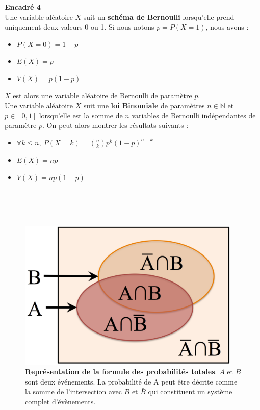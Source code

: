 \setlength{\columnsep}{1cm}
 \begin{minipage}{0.9\linewidth}
 \textbf{Encadré 4} \\
Une variable aléatoire $X$ suit un \textbf{schéma de Bernoulli} lorsqu'elle prend uniquement deux valeurs 0 ou 1. Si nous notons $p=P(X=1)$, nous avons :
\begin{itemize}
\item $P(X=0)=1-p$
\item $E(X)=p$
\item $V(X)=p(1-p)$
\end{itemize}
$X$ est alors une variable aléatoire de Bernoulli de paramètre $p$. \\
Une variable aléatoire $X$ suit une \textbf{loi Binomiale} de paramètres $n\in\mathbb{N}$ et $p\in[0,1]$ lorsqu'elle est la somme de $n$ variables de Bernoulli indépendantes de paramètre $p$. On peut alors montrer les résultats suivants :
\begin{itemize}
\item $\forall k \leq n,~ P(X=k)=\binom{n}{k}p^k(1-p)^{n-k}$
\item $E(X)=np$
\item $V(X)=np(1-p)$
\end{itemize}
 \end{minipage}
\\  \\  \\


\begin{figure}[h!]
\centering
\includegraphics[width=0.95\textwidth]{annexe1/fig/figAnnI3.pdf}
\caption[Représentation de la formule des probabilités totales.]{\textbf{Représentation de la formule des probabilités totales}. $A$ et $B$ sont deux événements. La probabilité de A peut être décrite comme la somme de l'intersection avec $B$ et $\bar B$ qui constituent un système complet d'évènements.}
\label{dess1}
\end{figure}

